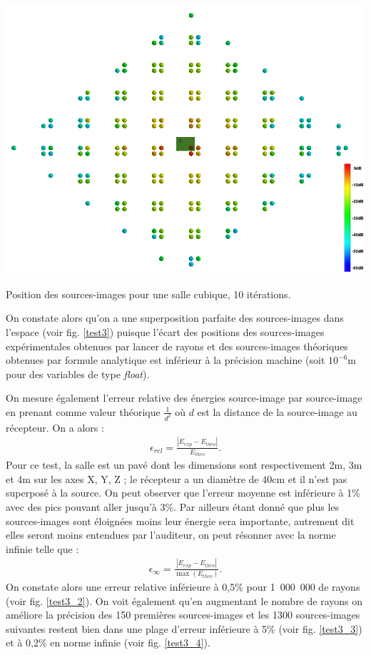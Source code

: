 \begin{figureth}
		\includegraphics[width=\linewidth]{images/test3_0}
		\caption{Position des sources-images pour une salle cubique, 10 itérations.}
		\label{test3}
	\end{figureth}

On constate alors qu'on a une superposition parfaite des sources-images dans l'espace (voir fig. \ref{test3}) puisque l'écart des positions des sources-images expérimentales obtenues par lancer de rayons et des sources-images théoriques obtenues par formule analytique est inférieur à la précision machine (soit $10^{-6}$m pour des variables de type \textit{float}). 

On mesure également l'erreur relative des énergies source-image par source-image en prenant comme valeur théorique $\frac{1}{d^2}$ où $d$ est la distance de la source-image au récepteur. On a alors :
\begin{align}
\epsilon_{rel} = \frac{|E_{exp}-E_{theo}|}{E_{theo}}.
\end{align}
%
Pour ce test, la salle est un pavé dont les dimensions sont respectivement 2m, 3m et 4m sur les axes X, Y, Z ; le récepteur a un diamètre de 40cm et il n'est pas superposé à la source. On peut observer que l'erreur moyenne est inférieure à 1\% avec des pics pouvant aller jusqu'à 3\%. Par ailleurs étant donné que plus les sources-images sont éloignées moins leur énergie sera importante, autrement dit elles seront moins entendues par l'auditeur, on peut résonner avec la norme infinie telle que :
\begin{align}
\epsilon_{\infty} = \frac{|E_{exp}-E_{theo}|}{\max(E_{theo})}.
\end{align}
%
On constate alors une erreur relative inférieure à 0,5\% pour 1~000~000 de rayons (voir fig. \ref{test3_2}). On voit également qu'en augmentant le nombre de rayons on améliore la précision des 150 premières sources-images et les 1300 sources-images suivantes restent bien dans une plage d'erreur inférieure à 5\% (voir fig. \ref{test3_3}) et à 0,2\% en norme infinie (voir fig. \ref{test3_4}).

